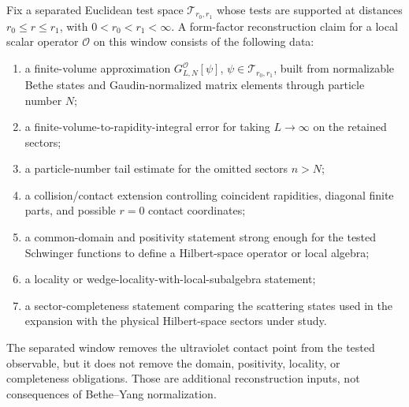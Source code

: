 \begin{controlledapproximation}
\label{ca:finite-volume-form-factor-separated-reconstruction-package}
Fix a separated Euclidean test space \(\mathcal T_{r_0,r_1}\) whose tests are
supported at distances \(r_0\le r\le r_1\), with \(0<r_0<r_1<\infty\).  A
form-factor reconstruction claim for a local scalar operator \(\mathcal O\) on
this window consists of the following data:
\begin{enumerate}
  \item a finite-volume approximation
  \(G_{L,N}^{\mathcal O}[\psi]\), \(\psi\in\mathcal T_{r_0,r_1}\), built from
  normalizable Bethe states and Gaudin-normalized matrix elements through
  particle number \(N\);
  \item a finite-volume-to-rapidity-integral error for taking \(L\to\infty\)
  on the retained sectors;
  \item a particle-number tail estimate for the omitted sectors \(n>N\);
  \item a collision/contact extension controlling coincident rapidities,
  diagonal finite parts, and possible \(r=0\) contact coordinates;
  \item a common-domain and positivity statement strong enough for the tested
  Schwinger functions to define a Hilbert-space operator or local algebra;
  \item a locality or wedge-locality-with-local-subalgebra statement;
  \item a sector-completeness statement comparing the scattering states used in
  the expansion with the physical Hilbert-space sectors under study.
\end{enumerate}
The separated window removes the ultraviolet contact point from the tested
observable, but it does not remove the domain, positivity, locality, or
completeness obligations.  Those are additional reconstruction inputs, not
consequences of Bethe--Yang normalization.
\end{controlledapproximation}


